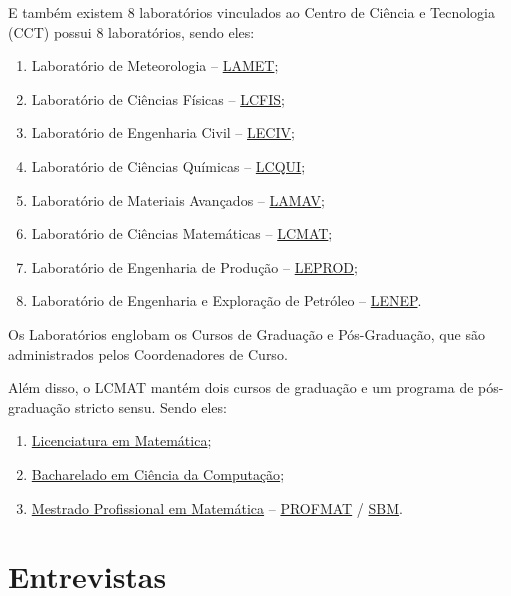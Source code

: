     E também existem 8 laboratórios vinculados ao Centro de Ciência e Tecnologia (CCT) possui 8 laboratórios, sendo eles:

    \begin{enumerate}
        \item Laboratório de Meteorologia – \href{https://uenf.br/cct/administracao/laboratorios/}{LAMET};
        \item Laboratório de Ciências Físicas – \href{https://uenf.br/cct/lcmat/}{LCFIS};
        \item Laboratório de Engenharia Civil – \href{https://uenf.br/cct/administracao/laboratorios/}{LECIV};
        \item Laboratório de Ciências Químicas – \href{https://uenf.br/cct/administracao/laboratorios/}{LCQUI};
        \item Laboratório de Materiais Avançados – \href{https://uenf.br/cct/administracao/laboratorios/}{LAMAV};
        \item Laboratório de Ciências Matemáticas – \href{https://uenf.br/cct/administracao/laboratorios/}{LCMAT};
        \item Laboratório de Engenharia de Produção – \href{https://uenf.br/cct/administracao/laboratorios/}{LEPROD};
        \item Laboratório de Engenharia e Exploração de Petróleo – \href{https://uenf.br/cct/administracao/laboratorios/}{LENEP}.
    \end{enumerate}

    Os Laboratórios englobam os Cursos de Graduação e Pós-Graduação, que são administrados pelos Coordenadores de Curso.

    Além disso, o LCMAT mantém dois cursos de graduação e um programa de pós-graduação stricto sensu. Sendo eles:
    
    \begin{enumerate}
        \item \href{https://uenf.br/posgraduacao/licenciatura-matematica/}{Licenciatura em Matemática};
        \item \href{https://cc.uenf.br/}{Bacharelado em Ciência da Computação};
        \item \href{https://uenf.br/posgraduacao/matematica/apresentacao/}{Mestrado Profissional em Matemática} – \href{https://uenf.br/posgraduacao/programas/pos-graduacao-stricto-sensu/}{PROFMAT} / \href{https://www.profmat-sbm.org.br/}{SBM}.
    \end{enumerate}

\section{Entrevistas} %

